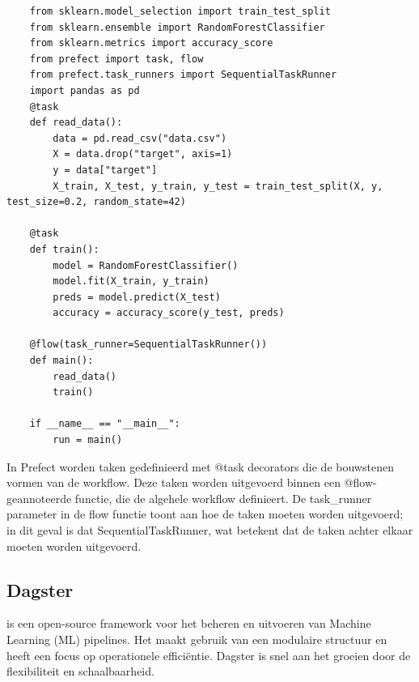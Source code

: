 \begin{verbatim}
    from sklearn.model_selection import train_test_split
    from sklearn.ensemble import RandomForestClassifier
    from sklearn.metrics import accuracy_score
    from prefect import task, flow
    from prefect.task_runners import SequentialTaskRunner
    import pandas as pd
    @task
    def read_data():
        data = pd.read_csv("data.csv")
        X = data.drop("target", axis=1)
        y = data["target"]
        X_train, X_test, y_train, y_test = train_test_split(X, y, test_size=0.2, random_state=42)

    @task    
    def train():
        model = RandomForestClassifier()
        model.fit(X_train, y_train)
        preds = model.predict(X_test)
        accuracy = accuracy_score(y_test, preds)
    
    @flow(task_runner=SequentialTaskRunner())
    def main():
        read_data()
        train()

    if __name__ == "__main__":
        run = main()
\end{verbatim}
In Prefect worden taken gedefinieerd met @task decorators die de bouwstenen vormen van de workflow. Deze taken worden uitgevoerd binnen een @flow-geannoteerde functie, die de algehele workflow definieert. De task_runner parameter in de flow functie toont aan hoe de taken moeten worden uitgevoerd; in dit geval is dat SequentialTaskRunner, wat betekent dat de taken achter elkaar moeten worden uitgevoerd.
\subsection{Dagster}
\textcite{Dagster2024} is een open-source framework voor het beheren en uitvoeren van Machine Learning (ML) pipelines. Het maakt gebruik van een modulaire structuur en heeft een focus op operationele efficiëntie. Dagster is snel aan het groeien door de flexibiliteit en schaalbaarheid.

